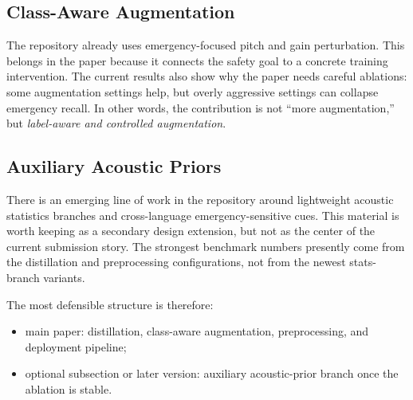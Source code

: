 \subsection{Class-Aware Augmentation}

The repository already uses emergency-focused pitch and gain perturbation. This belongs in the paper because it connects the safety goal to a concrete training intervention. The current results also show why the paper needs careful ablations: some augmentation settings help, but overly aggressive settings can collapse emergency recall. In other words, the contribution is not ``more augmentation,'' but \emph{label-aware and controlled augmentation}.

\subsection{Auxiliary Acoustic Priors}

There is an emerging line of work in the repository around lightweight acoustic statistics branches and cross-language emergency-sensitive cues. This material is worth keeping as a secondary design extension, but not as the center of the current submission story. The strongest benchmark numbers presently come from the distillation and preprocessing configurations, not from the newest stats-branch variants.

The most defensible structure is therefore:
\begin{itemize}
\item main paper: distillation, class-aware augmentation, preprocessing, and deployment pipeline;
\item optional subsection or later version: auxiliary acoustic-prior branch once the ablation is stable.
\end{itemize}

